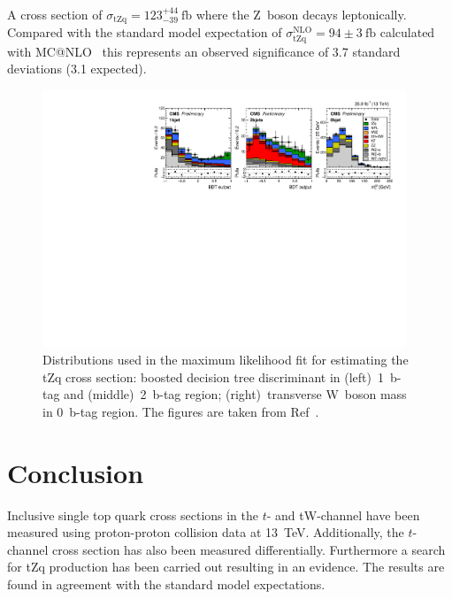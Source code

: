 \documentclass[12pt]{article}
\begin{document}
A cross section of $\sigma_\mathrm{tZq}=123^{+44}_{-39}~\mathrm{fb}$ where the Z~boson decays leptonically. Compared with the standard model expectation of $\sigma^\mathrm{NLO}_\mathrm{tZq}=94\pm3~\mathrm{fb}$ calculated with MC{@}NLO~\cite{mcatnlo} this represents an observed significance of 3.7 standard deviations (3.1 expected).

\begin{figure}[!htb]
\begin{center}
\includegraphics[width=0.97\textwidth]{tZq-fit.pdf}
\caption{Distributions used in the maximum likelihood fit for estimating the tZq cross section: boosted decision tree discriminant in (left)~1~b-tag and (middle)~2~b-tag region; (right)~transverse W~boson mass in 0~b-tag region. The figures are taken from Ref~\cite{tZq-inc}.}
\end{center}
\end{figure}


\section{Conclusion}

Inclusive single top quark cross sections in the $t$- and tW-channel have been measured using proton-proton collision data at 13~TeV. Additionally, the $t$-channel cross section has also been measured differentially. Furthermore a search for tZq production has been carried out resulting in an evidence. The results are found in agreement with the standard model expectations.

\begin{thebibliography}{99}


\end{thebibliography}

 
\end{document}
